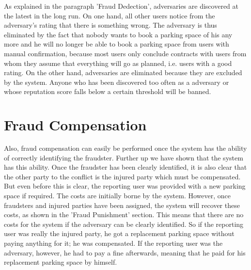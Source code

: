 As explained in the paragraph 'Fraud Dedection', adversaries are discovered at the latest in the long run. On one hand, all other users notice from the adversary's rating that there is something wrong. The adversary is thus eliminated by the fact that nobody wants to book a parking space of his any more and he will no longer be able to book a parking space from users with manual confirmation, because most users only conclude contracts with users from whom they assume that everything will go as planned, i.e. users with a good rating. On the other hand, adversaries are eliminated because they are excluded by the system. Anyone who has been discovered too often as a adversary or whose reputation score falls below a certain threshold will be banned.

\section{Fraud Compensation}
Also, fraud compensation can easily be performed once the system has the ability of correctly identifying the fraudster. Further up we have shown that the system has this ability. Once the fraudster has been clearly identified, it is also clear that the other party to the conflict is the injured party which must be compensated. \\

But even before this is clear, the reporting user was provided with a new parking space if required. The costs are initially borne by the system. However, once fraudsters and injured parties have been assigned, the system will recover these costs, as shown in the 'Fraud Punishment' section. This means that there are no costs for the system if the adversary can be clearly identified. So if the reporting user was really the injured party, he got a replacement parking space without paying anything for it; he was compensated. If the reporting user was the adversary, however, he had to pay a fine afterwards, meaning that he paid for his replacement parking space by himself.